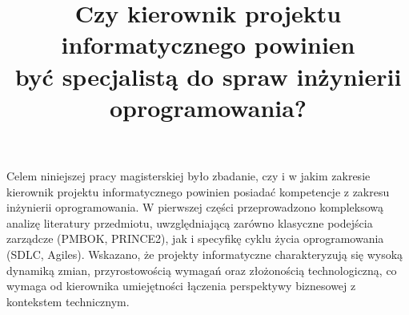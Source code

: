 \documentclass[
    left=2.5cm,         %
    right=2.5cm,        %
    top=2.5cm,          %
    bottom=3cm,         %
    bindingoffset=6mm,  %
    nohyphenation=false %
]{eiti/eiti-thesis}
\begin{document}
\title{
Czy kierownik projektu informatycznego powinien \\być specjalistą do spraw inżynierii oprogramowania?
}



\cleardoublepage %
\tableofcontents

\cleardoublepage %
\pagestyle{headings}
\renewcommand*{\bibfont}{\fontsize{10pt}{12pt}\selectfont}




\cleardoublepage %
\printbibliography

\newpage
\pagestyle{plain}

\vspace{0.8cm}

\listoffigurestoc     %
\vspace{1cm}          %
\listoftablestoc      %

\newpage %
\streszczenie
Celem niniejszej pracy magisterskiej było zbadanie, czy i w jakim zakresie kierownik projektu informatycznego powinien posiadać kompetencje z zakresu inżynierii oprogramowania. W pierwszej części przeprowadzono kompleksową analizę literatury przedmiotu, uwzględniającą zarówno klasyczne podejścia zarządcze (PMBOK, PRINCE2), jak i specyfikę cyklu życia oprogramowania (SDLC, Agiles). Wskazano, że projekty informatyczne charakteryzują się wysoką dynamiką zmian, przyrostowością wymagań oraz złożonością technologiczną, co wymaga od kierownika umiejętności łączenia perspektywy biznesowej z kontekstem technicznym.
\end{document}
